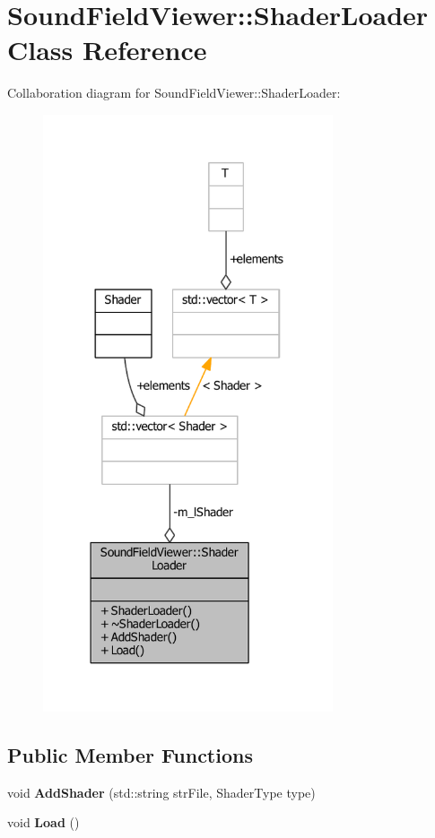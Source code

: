 \section{Sound\-Field\-Viewer\-:\-:Shader\-Loader Class Reference}
\label{classSoundFieldViewer_1_1ShaderLoader}


Collaboration diagram for Sound\-Field\-Viewer\-:\-:Shader\-Loader\-:
\nopagebreak
\begin{figure}[H]
\begin{center}
\leavevmode
\includegraphics[width=242pt]{dc/dd8/classSoundFieldViewer_1_1ShaderLoader__coll__graph}
\end{center}
\end{figure}
\subsection*{Public Member Functions}
\begin{DoxyCompactItemize}
\item 
void {\bfseries Add\-Shader} (std\-::string str\-File, Shader\-Type type)\label{classSoundFieldViewer_1_1ShaderLoader_a5342c3734c9bb71c5d7bd00fddf79772}

\item 
void {\bfseries Load} ()\label{classSoundFieldViewer_1_1ShaderLoader_a5dc4bc1ade5005d7ee17247feb9bcb91}

\end{DoxyCompactItemize}
